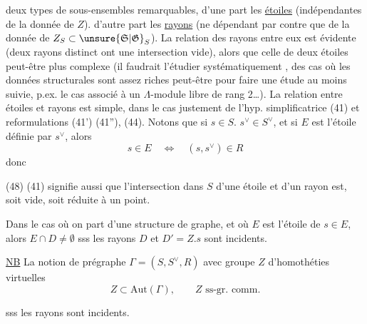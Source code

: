 deux types de sous-ensembles remarquables,
d'une part les \uline{étoiles} (indépendantes de la
donnée de $Z$). d'autre part les \uline{rayons} (ne
dépendant par contre que de la donnée de
$Z_{S}\subset\unsure{\mathfrak S|\mathfrak G}_S$). La relation  des rayons entre
eux est évidente (deux rayons distinct ont une
intersection vide), alors que celle de deux
étoiles peut-être plus complexe (il faudrait
l'étudier systématiquement ,  des cas où les
données structurales sont assez riches peut-être pour
faire une étude  au moins suivie, p.ex.
le cas associé à un  $\Lambda$-module libre de
rang 2\ldots). La relation entre étoiles et rayons
est simple, dans le cas justement de l'hyp.
simplificatrice (41) et reformulations (41') (41''), (44).
 
Notons   
que si $s\in S.$ $s^\vee\in S^\vee$, et si $E$  est l'étoile définie par $s^\vee$,
alors
\[
 s\in E\quad\Longleftrightarrow\quad(s,s^\vee)\in R
\]
donc 

(48)   (41) signifie aussi que l'intersection dans $S$
d'une étoile  et d'un rayon  est, soit vide,
soit réduite à un point.

Dans le cas où on part d'une structure de graphe,
et où $E$ est l'étoile de $s\in E$, alors $E\cap D\ne\emptyset$
sss les rayons $D$ et  $D'=Z.s$
sont incidents.

\uline{NB} La notion de prégraphe $\Gamma=(S,S^\vee,R)$ avec groupe $Z$ d'homothéties virtuelles
\[
 Z\subset\mathrm{Aut}(\Gamma),\qquad Z\text{ ss-gr. comm.}
\]

sss les rayons
sont incidents.

